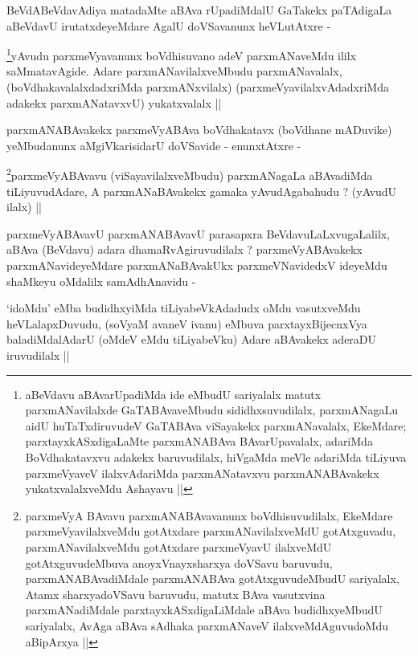 \begin{artha}
BeVdABeVdavAdiya matadaMte aBAva rUpadiMdalU GaTakekx paTAdigaLa
aBeVdavU irutatxdeyeMdare AgalU doVSavanunx heVLutAtxre - 
\end{artha}

\begin{artha}
\footnote[1]{aBeVdavu aBAvarUpadiMda ide eMbudU sariyalalx matutx
  parxmANavilalxde GaTABAvaveMbudu sididhxsuvudilalx, parxmANagaLu
  aidU huTaTxdiruvudeV GaTABAva viSayakekx parxmANavalalx, EkeMdare;
  parxtayxkASxdigaLaMte parxmANABAva BAvarUpavalalx, adariMda
  BoVdhakatavxvu adakekx baruvudilalx, hiVgaMda meVle adariMda
  tiLiyuva parxmeVyaveV ilalxvAdariMda parxmANatavxvu parxmANABAvakekx
  yukatxvalalxveMdu Ashayavu ||}yAvudu parxmeVyavanunx boVdhisuvano adeV parxmANaveMdu
ililx saMmatavAgide. Adare parxmANavilalxveMbudu parxmANavalalx,
(boVdhakavalalxdadxriMda parxmANxvilalx) (parxmeVyavilalxvAdadxriMda
adakekx parxmANatavxvU) yukatxvalalx ||
\end{artha}

\begin{artha}
parxmANABAvakekx parxmeVyABAva boVdhakatavx (boVdhane mADuvike)
yeMbudanunx aMgiVkarisidarU doVSavide - enunxtAtxre -
\end{artha}

\begin{artha}
\footnote[1]{parxmeVyA BAvavu parxmANABAvavanunx boVdhisuvudilalx,
  EkeMdare parxmeVyavilalxveMdu gotAtxdare parxmANavilalxveMdU
  gotAtxguvadu, parxmANavilalxveMdu gotAtxdare parxmeVyavU ilalxveMdU
  gotAtxguvudeMbuva anoyxVnayxsharxya doVSavu baruvudu,
  parxmANABAvadiMdale parxmANABAva gotAtxguvudeMbudU sariyalalx, Atamx
sharxyadoVSavu baruvudu, matutx BAva vasutxvina parxmANadiMdale
parxtayxkASxdigaLiMdale aBAva budidhxyeMbudU sariyalalx, AvAga aBAva
sAdhaka parxmANaveV ilalxveMdAguvudoMdu aBipArxya ||}parxmeVyABAvavu (viSayavilalxveMbudu) parxmANagaLa
aBAvadiMda tiLiyuvudAdare, A parxmANaBAvakekx gamaka yAvudAgabahudu ?
(yAvudU ilalx) ||
\end{artha}

\begin{artha}
parxmeVyABAvavU parxmANABAvavU parasapxra BeVdavuLaLxvugaLalilx,
  aBAva (BeVdavu) adara dhamaRvAgiruvudilalx ? parxmeVyABAvakekx
  parxmANavideyeMdare parxmANaBAvakUkx parxmeVNavidedxV ideyeMdu
  shaMkeyu oMdalilx samAdhAnavidu -
\end{artha}

\begin{artha}
`idoMdu' eMba budidhxyiMda tiLiyabeVkAdadudx oMdu vasutxveMdu
  heVLalapxDuvudu, (soV\s yaM avaneV ivanu) eMbuva parxtayxBijecnxVya
  baladiMdalAdarU (oMdeV eMdu tiLiyabeVku) Adare aBAvakekx aderaDU
  iruvudilalx ||
\end{artha}

